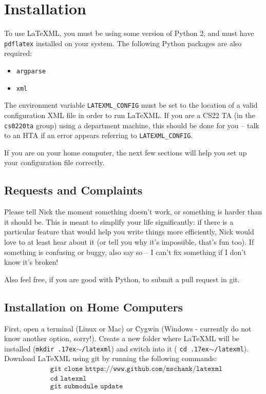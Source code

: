 \section{Installation}
  To use \LaTeX ML, you must be using some version of Python 2, and must have 
  \texttt{pdflatex} installed on your system. The following Python packages are 
  also required:
  
  \begin{itemize}\itemsep0pt
    \item \texttt{argparse}
    \item \texttt{xml}
  \end{itemize}
  
  The environment variable \texttt{LATEXML\_CONFIG} must be set to the location 
  of a valid configuration XML file in order to run \LaTeX ML. If you are a CS22
  TA (in the \texttt{cs0220ta} group) using a department machine, this should be
  done for you -- talk to an HTA if an error appears referring to 
  \texttt{LATEXML\_CONFIG}.
  
  If you are on your home computer, the next few sections will help you set up 
  your configuration file correctly.
  
  \subsection{Requests and Complaints}
    Please tell Nick the moment something doesn't work, or something is harder
    than it should be. This is meant to simplify your life significantly: if
    there is a particular feature that would help you write things more 
    efficiently, Nick would love to at least hear about it (or tell you 
    why it's impossible, that's fun too). If something is confusing or 
    buggy, also say so -- I can't fix something if I don't know it's broken!
    
    Also feel free, if you are good with Python, to submit a pull request 
    in git.
    
  \subsection{Installation on Home Computers}  
    \newcommand\mytilde{\raise.17ex\hbox{$\scriptstyle\sim$}}
    \newcommand\ttquote{\texttt{\char`\"}}
  
    First, open a terminal (Linux or Mac) or Cygwin (Windows - currently do not
    know another option, sorry!). Create a new folder where \LaTeX ML will 
    be installed (\texttt{mkdir \mytilde/latexml}) and switch into it (
    \texttt{cd \mytilde/latexml}). Download \LaTeX ML using git by running
    the following commands:
    \begin{align*}
      &\texttt{git clone https://www.github.com/nschank/latexml}\\
      &\texttt{cd latexml}\\
      &\texttt{git submodule update}\\
    \end{align*}
    
